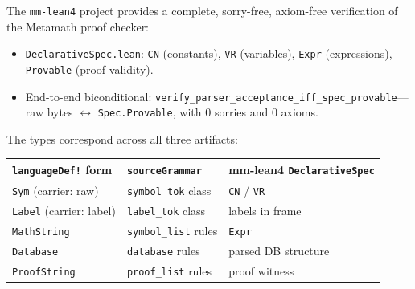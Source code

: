 \documentclass[11pt]{article}
\newcommand{\code}[1]{\texttt{#1}}
\begin{document}
The \code{mm-lean4} project provides a complete, sorry-free, axiom-free
verification of the Metamath proof checker:
\begin{itemize}
\item \code{DeclarativeSpec.lean}: \code{CN} (constants), \code{VR} (variables),
  \code{Expr} (expressions), \code{Provable} (proof validity).
\item End-to-end biconditional:
  \code{verify\_parser\_acceptance\_iff\_spec\_provable}---raw bytes
  $\leftrightarrow$ \code{Spec.Provable}, with 0 sorries and 0 axioms.
\end{itemize}

The types correspond across all three artifacts:

\begin{center}
\begin{tabular}{lll}
\toprule
\textbf{\code{languageDef!} form} & \textbf{\code{sourceGrammar}} & \textbf{mm-lean4 \code{DeclarativeSpec}} \\
\midrule
\code{Sym} (carrier: raw)   & \code{symbol\_tok} class   & \code{CN} / \code{VR} \\
\code{Label} (carrier: label) & \code{label\_tok} class & labels in frame \\
\code{MathString}            & \code{symbol\_list} rules  & \code{Expr} \\
\code{Database}              & \code{database} rules      & parsed DB structure \\
\code{ProofString}           & \code{proof\_list} rules   & proof witness \\
\bottomrule
\end{tabular}
\end{center}
\end{document}
